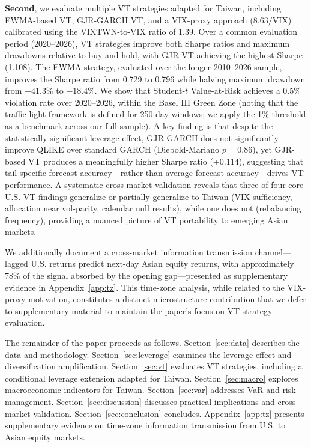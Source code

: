 \textbf{Second}, we evaluate multiple VT strategies adapted for Taiwan, including EWMA-based VT, GJR-GARCH VT, and a VIX-proxy approach ($8.63/\text{VIX}$) calibrated using the VIXTWN-to-VIX ratio of 1.39. Over a common evaluation period (2020--2026), VT strategies improve both Sharpe ratios and maximum drawdowns relative to buy-and-hold, with GJR VT achieving the highest Sharpe (1.108). The EWMA strategy, evaluated over the longer 2010--2026 sample, improves the Sharpe ratio from 0.729 to 0.796 while halving maximum drawdown from $-41.3\%$ to $-18.4\%$. We show that Student-$t$ Value-at-Risk achieves a 0.5\% violation rate over 2020--2026, within the Basel III Green Zone (noting that the traffic-light framework is defined for 250-day windows; we apply the 1\% threshold as a benchmark across our full sample). A key finding is that despite the statistically significant leverage effect, GJR-GARCH does not significantly improve QLIKE over standard GARCH (Diebold-Mariano $p = 0.86$), yet GJR-based VT produces a meaningfully higher Sharpe ratio (+0.114), suggesting that tail-specific forecast accuracy---rather than average forecast accuracy---drives VT performance. A systematic cross-market validation reveals that three of four core U.S. VT findings generalize or partially generalize to Taiwan (VIX sufficiency, allocation near vol-parity, calendar null results), while one does not (rebalancing frequency), providing a nuanced picture of VT portability to emerging Asian markets.

We additionally document a cross-market information transmission channel---lagged U.S. returns predict next-day Asian equity returns, with approximately 78\% of the signal absorbed by the opening gap---presented as supplementary evidence in Appendix~\ref{app:tz}. This time-zone analysis, while related to the VIX-proxy motivation, constitutes a distinct microstructure contribution that we defer to supplementary material to maintain the paper's focus on VT strategy evaluation.

The remainder of the paper proceeds as follows. Section~\ref{sec:data} describes the data and methodology. Section~\ref{sec:leverage} examines the leverage effect and diversification amplification. Section~\ref{sec:vt} evaluates VT strategies, including a conditional leverage extension adapted for Taiwan. Section~\ref{sec:macro} explores macroeconomic indicators for Taiwan. Section~\ref{sec:var} addresses VaR and risk management. Section~\ref{sec:discussion} discusses practical implications and cross-market validation. Section~\ref{sec:conclusion} concludes. Appendix~\ref{app:tz} presents supplementary evidence on time-zone information transmission from U.S. to Asian equity markets.


